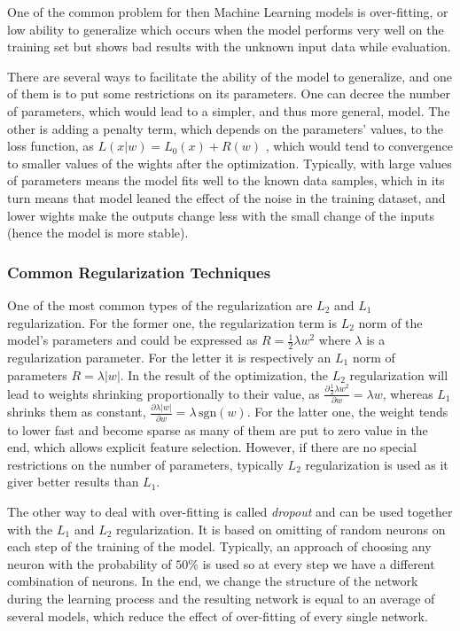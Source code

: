 One of the common problem for then Machine Learning models is over-fitting, or low ability to generalize which occurs when the model performs very well on the training set but shows bad results with the unknown input data while evaluation.
\medskip

There are several ways to facilitate the ability of the model to generalize, and one of them is to put some restrictions on its parameters.
One can decree the number of parameters, which would lead to a simpler, and thus more general, model.
The other is adding a penalty term, which depends on the parameters' values, to the loss function, as $L(x|w) = L_{0}(x) + R(w)$ , which would tend to convergence to smaller values of the wights after the optimization. 
Typically, with large values of parameters means the model fits well to the known data samples, which in its turn means that model leaned the effect of the noise in the training dataset, and lower wights make the outputs change less with the small change of the inputs (hence the model is more stable).
\medskip

\subsubsection{Common Regularization Techniques}

One of the most common types of the regularization are $L_{2}$ and $L_{1}$ regularization.
For the former one, the regularization term is $L_{2}$ norm of the model's parameters and could be expressed as $R=\frac{1}{2}\lambda w^{2}$ where $\lambda$ is a regularization parameter.
For the letter it is respectively an $L_{1}$ norm of parameters $R=\lambda |w|$.
In the result of the optimization, the $L_{2}$ regularization will lead to weights shrinking proportionally to their value, as $\frac{\partial \frac{1}{2} \lambda w^{2} }{\partial w} = \lambda w$, whereas $L_{1}$ shrinks them as constant, $\frac{\partial \lambda |w| }{\partial w} = \lambda \, \mathrm{sgn}(w) $.
For the latter one, the weight tends to lower fast and become sparse as many of them are put to zero value in the end, which allows explicit feature selection.
However, if there are no special restrictions on the number of parameters, typically $L_{2}$ regularization is used as it giver better results than $L_{1}$.
\medskip

The other way to deal with over-fitting is called \emph{dropout} and can be used together with the $L_{1}$ and $L_{2}$ regularization.
It is based on omitting of random neurons on each step of the training of the model.
Typically, an approach of choosing any neuron with the probability of $50\%$ is used so at every step we have a different combination of neurons.
In the end, we change the structure of the network during the learning process and the resulting network is equal to an average of several models, which reduce the effect of over-fitting of every single network.

